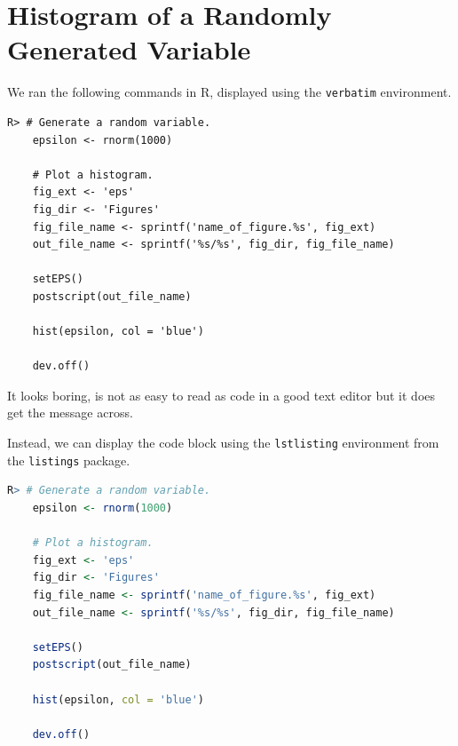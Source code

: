 \documentclass[11pt]{book}
\begin{document}
\section*{Histogram of a Randomly Generated Variable}

We ran the following commands in R, 
displayed using the \texttt{verbatim} environment.

\begin{verbatim}
R> # Generate a random variable.
    epsilon <- rnorm(1000)

    # Plot a histogram.
    fig_ext <- 'eps'
    fig_dir <- 'Figures'
    fig_file_name <- sprintf('name_of_figure.%s', fig_ext)
    out_file_name <- sprintf('%s/%s', fig_dir, fig_file_name)

    setEPS()
    postscript(out_file_name)

    hist(epsilon, col = 'blue')

    dev.off()

\end{verbatim}

It looks boring, is not as easy to read as code in a good text editor
but it does get the message across. 


\pagebreak

Instead, we can display the code block using the 
\texttt{lstlisting} environment from the \texttt{listings} package. 

\begin{lstlisting}[language=R]
R> # Generate a random variable.
    epsilon <- rnorm(1000)

    # Plot a histogram.
    fig_ext <- 'eps'
    fig_dir <- 'Figures'
    fig_file_name <- sprintf('name_of_figure.%s', fig_ext)
    out_file_name <- sprintf('%s/%s', fig_dir, fig_file_name)

    setEPS()
    postscript(out_file_name)

    hist(epsilon, col = 'blue')

    dev.off()

\end{lstlisting}
\end{document}

